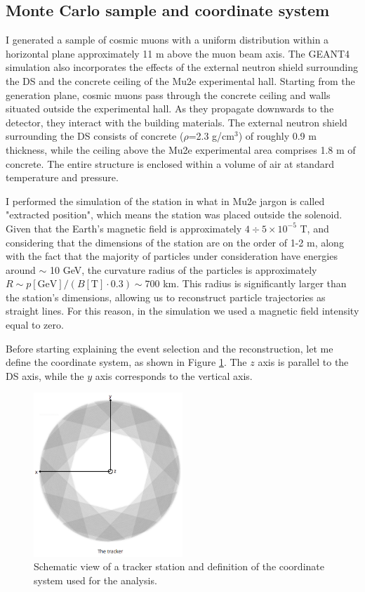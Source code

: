 \subsection{Monte Carlo sample and coordinate system }\label{genplane}
I generated a sample of cosmic muons with a uniform distribution within a
horizontal plane approximately 11 m above the muon beam axis. The GEANT4 
simulation also incorporates the effects of the external neutron shield surrounding the DS 
and the concrete ceiling of the Mu2e experimental hall. Starting from the generation plane, 
cosmic muons pass through the concrete ceiling and walls situated outside the experimental hall. 
As they propagate downwards to the detector, they interact with the building materials. 
The external neutron shield surrounding the DS consists of concrete ($\rho$=2.3 g/cm$^3$) of  
roughly 0.9 m thickness, while the ceiling above the Mu2e experimental area comprises 1.8 m of concrete. 
The entire structure is enclosed within a volume of air at standard temperature and pressure.

I performed the simulation of the station in what in Mu2e jargon is called
"extracted position", which means the station was placed outside the solenoid.
Given that the Earth's magnetic field is approximately 
$4 \div 5 \times 10^{-5}$ T, 
and considering that the dimensions of the station are 
on the order of 1-2 m, 
along with the fact that the majority of particles 
under consideration have energies around $\sim$ 10 GeV, 
the curvature radius of the particles is approximately 
$R\sim p[\text{GeV}]/(B[\text{T}]\cdot 0.3) \sim 700$ km. 
This radius is significantly larger than the station's 
dimensions, allowing us to reconstruct particle trajectories 
as straight lines.
For this reason, in the simulation we used a 
magnetic field intensity equal to zero. 

Before starting explaining the event selection and the 
reconstruction, let me define the coordinate system, 
as shown in Figure \ref{fig:coordinate}. The $z$ axis is parallel to 
the DS axis, while the $y$ axis corresponds to the vertical axis.
\begin{figure}[!h]
    \centering
    \includegraphics[width =0.5\textwidth]{figures/png/Screenshot_20240526_164527.png}
    \caption[Schematic view of a tracker station and the coordinate system.]{Schematic view of a tracker station and definition of the coordinate system used for the analysis.}
    \label{fig:coordinate}
\end{figure}
